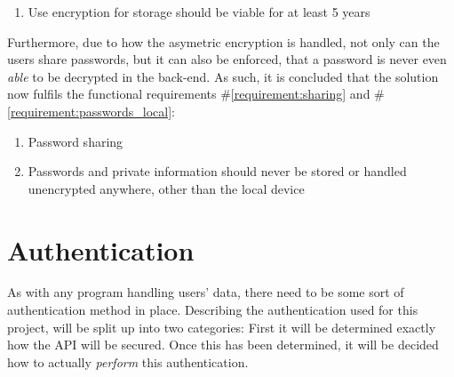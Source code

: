 			\vspace{-3ex}\begin{enumerate}
				\setlength\itemsep{0.1em}
				\setcounter{enumi}{4-1}
				\item Use encryption for storage should be viable for at least 5 years
			\end{enumerate}

			Furthermore, due to how the asymetric encryption is handled, not only can the users share passwords, but it can also be enforced, that a password is never even \emph{able} to be decrypted in the back-end. As such, it is concluded that the solution now fulfils the functional requirements \#\ref{requirement:sharing} and \#\ref{requirement:passwords_local}:
			\vspace{-3ex}\begin{enumerate}
				\setlength\itemsep{0.1em}
				\setcounter{enumi}{5-1}
				\item Password sharing
				\setcounter{enumi}{9-1}
				\item Passwords and private information should never be stored or handled unencrypted anywhere, other than the local device
			\end{enumerate}




	\section{Authentication}
		\label{sec:design:authentication}
		As with any program handling users' data, there need to be some sort of authentication method in place. Describing the authentication used for this project, will be split up into two categories: First it will be determined exactly how the API will be secured. Once this has been determined, it will be decided how to actually \emph{perform} this authentication.

